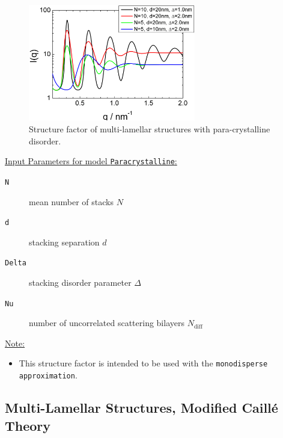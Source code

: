 \begin{figure}[htb]
\begin{center}
\includegraphics[width=0.65\textwidth,height=0.5\textwidth]{../images/structure_factor/Lamellar/PCLamellar.png}
\end{center}
\caption{Structure factor of multi-lamellar structures with para-crystalline disorder. }
\label{fig:PCLamellar}
\end{figure}

\vspace{5mm}

\noindent
\underline{Input Parameters for model \texttt{Paracrystalline}:}
\begin{description}
\item[\texttt{N}] mean number of stacks $N$
\item[\texttt{d}] stacking separation $d$
\item[\texttt{Delta}]  stacking disorder parameter $\Delta$
\item[\texttt{Nu}]   number of uncorrelated scattering bilayers $N_\text{diff}$
\end{description}

\noindent\underline{Note:}
\begin{itemize}
\item This structure factor is intended to be used with the \texttt{monodisperse approximation}.
\end{itemize}


\clearpage
\subsection{Multi-Lamellar Structures, Modified Caill\'e Theory} ~\\

